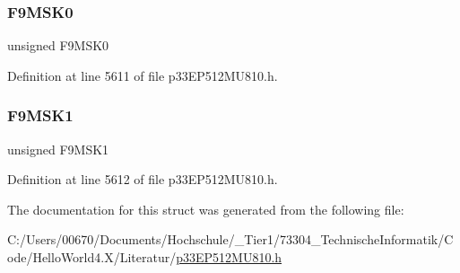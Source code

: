 \subsubsection{\texorpdfstring{F9\+M\+S\+K0}{F9MSK0}}
{\footnotesize\ttfamily unsigned F9\+M\+S\+K0}



Definition at line 5611 of file p33\+E\+P512\+M\+U810.\+h.

\mbox{\label{structtag_c2_f_m_s_k_s_e_l2_b_i_t_s_a0a50875460baa60f96ea09203b5aa366}} 
\subsubsection{\texorpdfstring{F9\+M\+S\+K1}{F9MSK1}}
{\footnotesize\ttfamily unsigned F9\+M\+S\+K1}



Definition at line 5612 of file p33\+E\+P512\+M\+U810.\+h.



The documentation for this struct was generated from the following file\+:\begin{DoxyCompactItemize}
\item 
C\+:/\+Users/00670/\+Documents/\+Hochschule/\+\_\+\+Tier1/73304\+\_\+\+Technische\+Informatik/\+Code/\+Hello\+World4.\+X/\+Literatur/\hyperlink{p33_e_p512_m_u810_8h}{p33\+E\+P512\+M\+U810.\+h}\end{DoxyCompactItemize}
